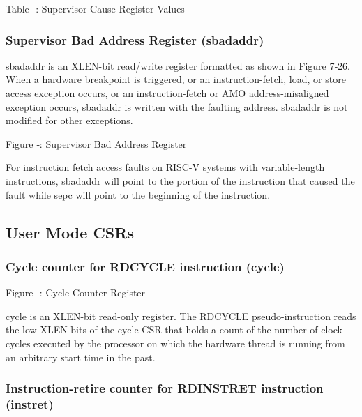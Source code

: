 \protect\hypertarget{_Ref326948300}{}{}Table ‑: Supervisor Cause
Register Values

\subsubsection{Supervisor Bad Address Register
(sbadaddr)}\label{supervisor-bad-address-register-sbadaddr}

sbadaddr is an XLEN-bit read/write register formatted as shown in Figure
7‑26. When a hardware breakpoint is triggered, or an instruction-fetch,
load, or store access exception occurs, or an instruction-fetch or AMO
address-misaligned exception occurs, sbadaddr is written with the
faulting address. sbadaddr is not modified for other exceptions.

\missingfigure{}

\protect\hypertarget{_Ref367099017}{}{}Figure ‑: Supervisor Bad Address
Register

For instruction fetch access faults on RISC-V systems with
variable-length instructions, sbadaddr will point to the portion of the
instruction that caused the fault while sepc will point to the beginning
of the instruction.

\protect\hypertarget{_Toc327108372}{}{}

\subsection{User Mode CSRs}\label{user-mode-csrs}

\subsubsection{Cycle counter for RDCYCLE instruction
(cycle)}\label{cycle-counter-for-rdcycle-instruction-cycle}

\missingfigure{}

Figure ‑: Cycle Counter Register

cycle is an XLEN-bit read-only register. The RDCYCLE pseudo-instruction
reads the low XLEN bits of the cycle CSR that holds a count of the
number of clock cycles executed by the processor on which the hardware
thread is running from an arbitrary start time in the past.

\subsubsection{Instruction-retire counter for RDINSTRET instruction
(instret)}\label{instruction-retire-counter-for-rdinstret-instruction-instret}

